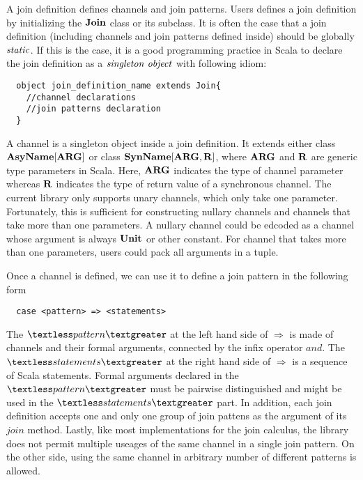 A join definition defines channels and join patterns.  Users defines a join definition by initializing the $\bf{Join}$ class or its subclass.  It is often the case that a join definition (including channels and join patterns defined inside) should be globally $\it{static}$.  If this is the case, it is a good programming practice in Scala to declare the join definition as a $\it{singleton\ object}$ with following idiom:

\begin{lstlisting}
  object join_definition_name extends Join{
    //channel declarations
    //join patterns declaration
  }
\end{lstlisting}

A channel is a singleton object inside a join definition.  It extends either class $\bf{AsyName[ARG]}$ or class $\bf{SynName[ARG,R]}$, where $\bf{ARG}$ and $\bf{R}$ are generic type parameters in Scala.  Here, $\bf{ARG}$ indicates the type of channel parameter whereas $\bf{R}$ indicates the type of return value of a synchronous channel.  The current library only supports unary channels, which only take one parameter.  Fortunately, this is sufficient for constructing nullary channels and channels that take more than one parameters.  A nullary channel could be edcoded as a channel whose argument is always $\bf{Unit}$ or other constant.  For channel that takes more than one parameters, users could pack all arguments in a tuple.

Once a channel is defined, we can use it to define a join pattern in the following form
\begin{lstlisting}
  case <pattern> => <statements>
\end{lstlisting}

The $\textless pattern \textgreater$ at the left hand side of $\Rightarrow$ is made of channels and their formal arguments, connected by the infix operator $and$.  The  $\textless statements \textgreater$ at the right hand side of $\Rightarrow$ is a sequence of Scala statements.  Formal arguments declared in the  $\textless pattern \textgreater$ must be pairwise distinguished and might be used in the  $\textless statements \textgreater$ part.  In addition, each join definition accepts one and only one group of join pattens as the argument of its $join$ method.  Lastly, like most implementations for the join calculus, the library does not permit multiple useages of the same channel in a single join pattern.  On the other side, using the same channel in arbitrary number of different patterns is allowed.

